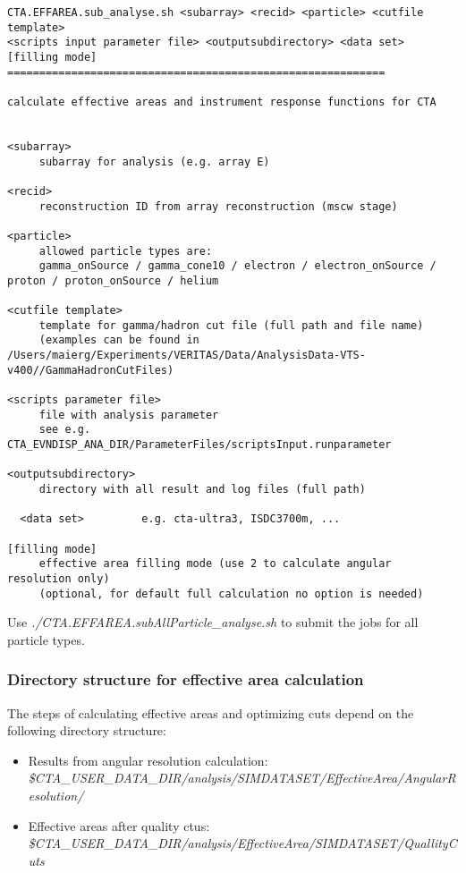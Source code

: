 \documentclass[titlepage,a4paper,twoside,11pt]{report}
\begin{document}
\begin{lstlisting}
CTA.EFFAREA.sub_analyse.sh <subarray> <recid> <particle> <cutfile template> 
<scripts input parameter file> <outputsubdirectory> <data set> [filling mode]
===========================================================

calculate effective areas and instrument response functions for CTA


<subarray>
     subarray for analysis (e.g. array E)

<recid>
     reconstruction ID from array reconstruction (mscw stage)

<particle>
     allowed particle types are:
     gamma_onSource / gamma_cone10 / electron / electron_onSource / proton / proton_onSource / helium 

<cutfile template>
     template for gamma/hadron cut file (full path and file name)
     (examples can be found in /Users/maierg/Experiments/VERITAS/Data/AnalysisData-VTS-v400//GammaHadronCutFiles)

<scripts parameter file>
     file with analysis parameter
     see e.g. CTA_EVNDISP_ANA_DIR/ParameterFiles/scriptsInput.runparameter

<outputsubdirectory>
     directory with all result and log files (full path)

  <data set>         e.g. cta-ultra3, ISDC3700m, ...  

[filling mode]
     effective area filling mode (use 2 to calculate angular resolution only)
     (optional, for default full calculation no option is needed)

\end{lstlisting}

Use {\it  ./CTA.EFFAREA.subAllParticle\_analyse.sh} to submit the jobs for all particle types.

\subsubsection{Directory structure for effective area calculation}

The steps of calculating effective areas and optimizing cuts depend on the following directory structure:

\begin{itemize}
\item Results from angular resolution calculation: \\
{\it \$CTA\_USER\_DATA\_DIR/analysis/SIMDATASET/EffectiveArea/AngularResolution/}
\item Effective areas after quality ctus:\\
{\it \$CTA\_USER\_DATA\_DIR/analysis/EffectiveArea/SIMDATASET/QuallityCuts}
\end{itemize}
\end{document}
